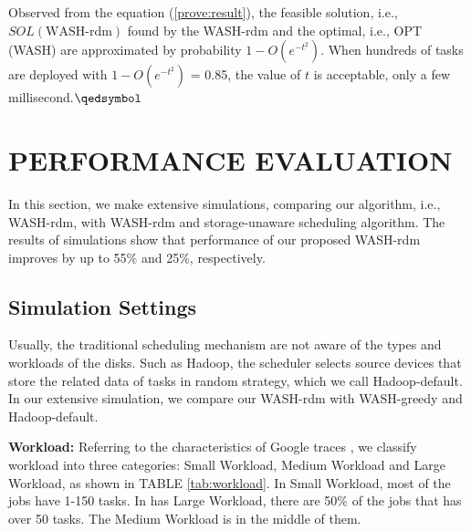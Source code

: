 \documentclass[conference]{IEEEtran}
\begin{document}
Observed from the equation (\ref{prove:result}), the feasible solution, i.e., $SOL(\text{WASH-rdm})$ found by the WASH-rdm and the optimal, i.e., OPT (WASH) are approximated by probability $1 - O(e^{-t^2})$. When hundreds of tasks are deployed with $1 - O(e^{-t^2})$ = 0.85, the value of $t$ is acceptable, only a few millisecond.\hfill $\qedsymbol$

\section{PERFORMANCE EVALUATION}\label{PERFORMANCE_EVALUATION}

In this section, we make extensive simulations, comparing our algorithm, i.e., WASH-rdm, with WASH-rdm and storage-unaware scheduling algorithm. The results of simulations show that performance of our proposed WASH-rdm improves by up to 55\% and 25\%, respectively.
\subsection{Simulation Settings}\label{SCM}
Usually, the traditional scheduling mechanism are not aware of the types and workloads of the disks. Such as Hadoop, the scheduler selects source devices that store the related data of tasks in random strategy, which we call Hadoop-default. In our extensive simulation, we compare our WASH-rdm with WASH-greedy and Hadoop-default.

\textbf{Workload:} Referring to the characteristics of Google traces \cite{b20}, we classify workload into three categories: Small Workload, Medium Workload and Large Workload, as shown in TABLE \ref{tab:workload}. In Small Workload, most of the jobs have 1-150 tasks. In has Large Workload, there are 50\% of the jobs that has over 50 tasks. The Medium Workload is in the middle of them.
\end{document}
